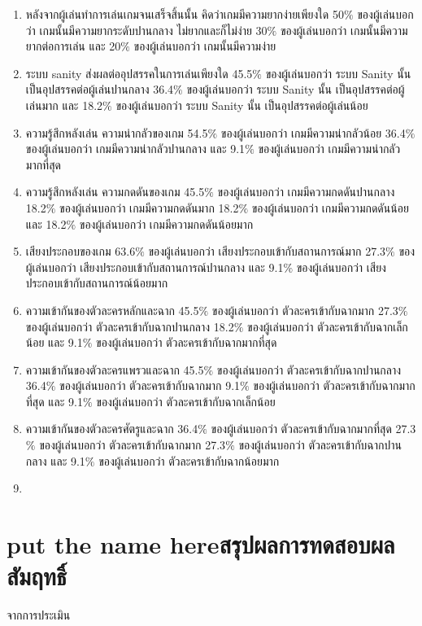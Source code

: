 \begin{enumerate}
    \item หลังจากผู้เล่นทำการเล่นเกมจนเสร็จสิ้นนั้น คิดว่าเกมมีความยากง่ายเพียงใด 50$\%$ ของผู้เล่นบอกว่า เกมนั้นมีความยากระดับปานกลาง ไม่ยากและก็ไม่ง่าย 30$\%$ ของผู้เล่นบอกว่า เกมนั้นมีความยากต่อการเล่น และ 20$\%$ ของผู้เล่นบอกว่า เกมนั้นมีความง่าย
    \item ระบบ sanity ส่งผลต่ออุปสรรคในการเล่นเพียงใด 45.5$\%$ ของผู้เล่นบอกว่า ระบบ Sanity นั้น เป็นอุปสรรคต่อผู้เล่นปานกลาง 36.4$\%$ ของผู้เล่นบอกว่า ระบบ Sanity นั้น เป็นอุปสรรคต่อผู้เล่นมาก และ 18.2$\%$ ของผู้เล่นบอกว่า ระบบ Sanity นั้น เป็นอุปสรรคต่อผู้เล่นน้อย
    \item ความรู้สึกหลังเล่น ความน่ากลัวของเกม 54.5$\%$ ของผู้เล่นบอกว่า เกมมีความน่ากลัวน้อย 36.4$\%$ ของผู้เล่นบอกว่า เกมมีความน่ากลัวปานกลาง และ 9.1$\%$ ของผู้เล่นบอกว่า เกมมีความน่ากลัวมากที่สุด
    \item ความรู้สึกหลังเล่น ความกดดันของเกม 45.5$\%$ ของผู้เล่นบอกว่า เกมมีความกดดันปานกลาง 18.2$\%$ ของผู้เล่นบอกว่า เกมมีความกดดันมาก 18.2$\%$ ของผู้เล่นบอกว่า เกมมีความกดดันน้อย และ 18.2$\%$ ของผู้เล่นบอกว่า เกมมีความกดดันน้อยมาก
    \item เสียงประกอบของเกม 63.6$\%$ ของผู้เล่นบอกว่า เสียงประกอบเข้ากับสถานการณ์มาก 27.3$\%$ ของผู้เล่นบอกว่า เสียงประกอบเข้ากับสถานการณ์ปานกลาง และ 9.1$\%$ ของผู้เล่นบอกว่า เสียงประกอบเข้ากับสถานการณ์น้อยมาก
    \item ความเข้ากันของตัวละครหลักและฉาก 45.5$\%$ ของผู้เล่นบอกว่า ตัวละครเข้ากับฉากมาก 27.3$\%$ ของผู้เล่นบอกว่า ตัวละครเข้ากับฉากปานกลาง 18.2$\%$ ของผู้เล่นบอกว่า ตัวละครเข้ากับฉากเล็กน้อย และ 9.1$\%$ ของผู้เล่นบอกว่า ตัวละครเข้ากับฉากมากที่สุด
    \item ความเข้ากันของตัวละครแพรวและฉาก 45.5$\%$ ของผู้เล่นบอกว่า ตัวละครเข้ากับฉากปานกลาง 36.4$\%$ ของผู้เล่นบอกว่า ตัวละครเข้ากับฉากมาก 9.1$\%$ ของผู้เล่นบอกว่า ตัวละครเข้ากับฉากมากที่สุด และ 9.1$\%$ ของผู้เล่นบอกว่า ตัวละครเข้ากับฉากเล็กน้อย
    \item ความเข้ากันของตัวละครศัตรูและฉาก 36.4$\%$ ของผู้เล่นบอกว่า ตัวละครเข้ากับฉากมากที่สุด 27.3$\%$ ของผู้เล่นบอกว่า ตัวละครเข้ากับฉากมาก 27.3$\%$ ของผู้เล่นบอกว่า ตัวละครเข้ากับฉากปานกลาง และ 9.1$\%$ ของผู้เล่นบอกว่า ตัวละครเข้ากับฉากน้อยมาก
    \item 
\end{enumerate}

\section{\ifenglish put the name here\else สรุปผลการทดสอบผลสัมฤทธิ์\fi}
จากการประเมิน
